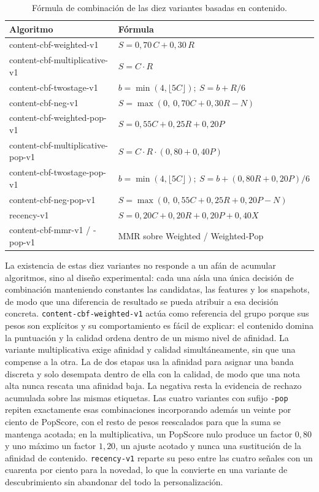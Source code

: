 \begin{table}[H]
\centering
\caption{Fórmula de combinación de las diez variantes basadas en contenido.}\label{tab:variantes-contenido}
\small
\begin{tabularx}{\textwidth}{@{}>{\ttfamily\raggedright\arraybackslash}p{}>{\raggedleft\arraybackslash}X@{}}
\textnormal{Algoritmo} & \textnormal{Fórmula} \\
\hline
content-cbf-weighted-v1 & \(S = 0{,}70\,C + 0{,}30\,R\) \\
content-cbf-multiplicative-v1 & \(S = C \cdot R\) \\
content-cbf-twostage-v1 & \(b=\min(4,\lfloor 5C\rfloor);\ S = b + R/6\) \\
content-cbf-neg-v1 & \(S = \max(0,\ 0{,}70C + 0{,}30R - N)\) \\
content-cbf-weighted-pop-v1 & \(S = 0{,}55C + 0{,}25R + 0{,}20P\) \\
content-cbf-multiplicative-pop-v1 & \(S = C \cdot R \cdot (0{,}80 + 0{,}40P)\) \\
content-cbf-twostage-pop-v1 & \(b=\min(4,\lfloor 5C\rfloor);\ S = b + (0{,}80R+0{,}20P)/6\) \\
content-cbf-neg-pop-v1 & \(S = \max(0,\ 0{,}55C + 0{,}25R + 0{,}20P - N)\) \\
recency-v1 & \(S = 0{,}20C + 0{,}20R + 0{,}20P + 0{,}40X\) \\
content-cbf-mmr-v1 / -pop-v1 & MMR sobre Weighted / Weighted-Pop \\
\end{tabularx}
\end{table}

La existencia de estas diez variantes no responde a un afán de acumular algoritmos, sino al
diseño experimental: cada una aísla una única decisión de combinación manteniendo constantes
las candidatas, las features y los snapshots, de modo que una diferencia de resultado se pueda
atribuir a esa decisión concreta. \texttt{content-cbf-weighted-v1} actúa como referencia del
grupo porque sus pesos son explícitos y su comportamiento es fácil de explicar: el contenido
domina la puntuación y la calidad ordena dentro de un mismo nivel de afinidad. La variante
multiplicativa exige afinidad y calidad simultáneamente, sin que una compense a la otra. La de
dos etapas usa la afinidad para asignar una banda discreta y solo desempata dentro de ella con
la calidad, de modo que una nota alta nunca rescata una afinidad baja. La negativa resta la
evidencia de rechazo acumulada sobre las mismas etiquetas. Las cuatro variantes con sufijo
\texttt{-pop} repiten exactamente esas combinaciones incorporando además un veinte por ciento
de PopScore, con el resto de pesos reescalados para que la suma se mantenga acotada; en la
multiplicativa, un PopScore nulo produce un factor \(0{,}80\) y uno máximo un factor
\(1{,}20\), un ajuste acotado y nunca una sustitución de la afinidad de contenido.
\texttt{recency-v1} reparte su peso entre las cuatro señales con un cuarenta por ciento para la
novedad, lo que la convierte en una variante de descubrimiento sin abandonar del todo la
personalización.

